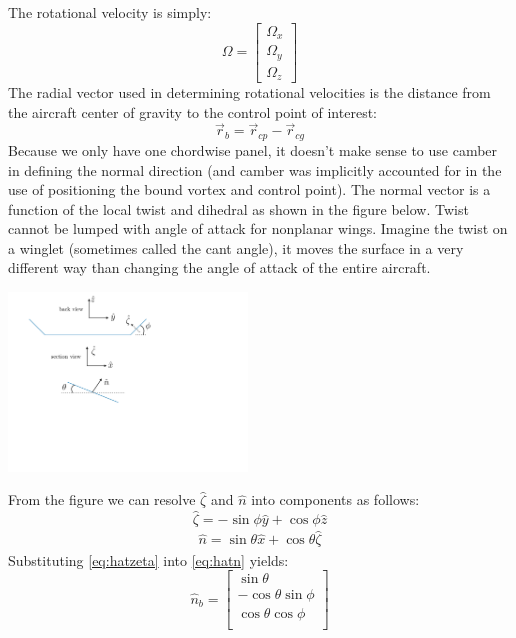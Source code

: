 \documentclass{article}
\begin{document}
The rotational velocity is simply:
\begin{equation}
    \Omega =
    \begin{bmatrix}
    \Omega_x\\ \Omega_y\\ \Omega_z
    \end{bmatrix}
\end{equation}
The radial vector used in determining rotational velocities is the distance from the aircraft center of gravity to the control point of interest:
\begin{equation}
\vec{r}_b = \vec r_{cp} - \vec r_{cg}
\end{equation}
Because we only have one chordwise panel, it doesn't make sense to use camber in defining the normal direction (and camber was implicitly accounted for in the use of positioning the bound vortex and control point).  The normal vector is a function of the local twist and dihedral as shown in the figure below.  Twist cannot be lumped with angle of attack for nonplanar wings.  Imagine the twist on a winglet (sometimes called the cant angle), it moves  the surface in a very different way than changing the angle of attack of the entire aircraft.
\begin{center}
\includegraphics[width=2.5in]{figs/normalvector}
\end{center}
From the figure we can resolve $\hat\zeta$ and $\hat{n}$ into components as follows:
\begin{equation}
\hat\zeta = -\sin\phi \hat{y} + \cos\phi \hat{z}
\label{eq:hatzeta}
\end{equation}
\begin{align}
\hat{n} = \sin\theta \hat{x} + \cos\theta \hat{\zeta}
\label{eq:hatn}
\end{align}
Substituting \cref{eq:hatzeta} into \cref{eq:hatn} yields:
\begin{equation}
    \hat{n}_b =
    \begin{bmatrix}
        \sin\theta\\
        -\cos\theta\sin\phi\\
        \cos\theta\cos\phi\\
    \end{bmatrix}
\end{equation}
\end{document}

